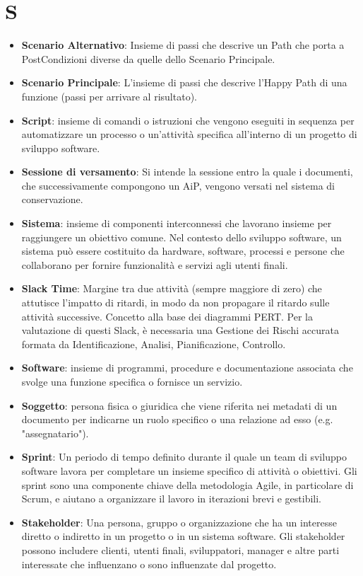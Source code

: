 \documentclass[a4paper,12pt]{article}
\begin{document}
\section{S}
\begin{itemize}
    \item \textbf{Scenario Alternativo}: Insieme di passi che descrive un Path che porta a PostCondizioni diverse da quelle dello Scenario Principale.
    \item \textbf{Scenario Principale}: L'insieme di passi che descrive l'Happy Path di una funzione (passi per arrivare al risultato).
    \item \textbf{Script}: insieme di comandi o istruzioni che vengono eseguiti in sequenza per automatizzare un processo o un'attività specifica all'interno di un progetto di sviluppo software.
    \item \textbf{Sessione di versamento}: Si intende la sessione entro la quale i documenti, che successivamente compongono un AiP, vengono versati nel sistema di conservazione.
    \item \textbf{Sistema}: insieme di componenti interconnessi che lavorano insieme per raggiungere un obiettivo comune. Nel contesto dello sviluppo software, un sistema può essere costituito da hardware, software, processi e persone che collaborano per fornire funzionalità e servizi agli utenti finali.
    \item \textbf{Slack Time}: Margine tra due attività (sempre maggiore di zero) che attutisce l'impatto di ritardi, in modo da non propagare il ritardo sulle attività successive. Concetto alla base dei diagrammi PERT. Per la valutazione di questi Slack, è necessaria una Gestione dei Rischi accurata formata da Identificazione, Analisi, Pianificazione, Controllo.
    \item \textbf{Software}: insieme di programmi, procedure e documentazione associata che svolge una funzione specifica o fornisce un servizio.
    \item \textbf{Soggetto}: persona fisica o giuridica che viene riferita nei metadati di un documento per indicarne un ruolo specifico o una relazione ad esso (e.g. "assegnatario").
    \item \textbf{Sprint}: Un periodo di tempo definito durante il quale un team di sviluppo software lavora per completare un insieme specifico di attività o obiettivi. Gli sprint sono una componente chiave della metodologia Agile, in particolare di Scrum, e aiutano a organizzare il lavoro in iterazioni brevi e gestibili.
    \item \textbf{Stakeholder}: Una persona, gruppo o organizzazione che ha un interesse diretto o indiretto in un progetto o in un sistema software. Gli stakeholder possono includere clienti, utenti finali, sviluppatori, manager e altre parti interessate che influenzano o sono influenzate dal progetto.

\end{itemize}
\end{document}
